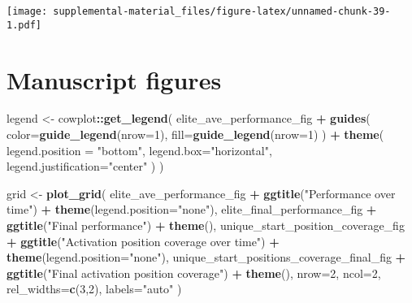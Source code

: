 \documentclass[]{book}
\newenvironment{Shaded}{\begin{snugshade}}{\end{snugshade}}
\newcommand{\DataTypeTok}[1]{\textcolor[rgb]{0.13,0.29,0.53}{#1}}
\newcommand{\DecValTok}[1]{\textcolor[rgb]{0.00,0.00,0.81}{#1}}
\newcommand{\KeywordTok}[1]{\textcolor[rgb]{0.13,0.29,0.53}{\textbf{#1}}}
\newcommand{\NormalTok}[1]{#1}
\newcommand{\OperatorTok}[1]{\textcolor[rgb]{0.81,0.36,0.00}{\textbf{#1}}}
\newcommand{\StringTok}[1]{\textcolor[rgb]{0.31,0.60,0.02}{#1}}
\begin{document}
\texttt{[image: supplemental-material\_files/figure-latex/unnamed-chunk-39-1.pdf]}

\hypertarget{manuscript-figures-2}{%
\section{Manuscript figures}\label{manuscript-figures-2}}

\begin{Shaded}
\begin{Highlighting}[]
\NormalTok{legend <-}\StringTok{ }\NormalTok{cowplot}\OperatorTok{::}\KeywordTok{get_legend}\NormalTok{(}
\NormalTok{    elite_ave_performance_fig }\OperatorTok{+}
\StringTok{      }\KeywordTok{guides}\NormalTok{(}
        \DataTypeTok{color=}\KeywordTok{guide_legend}\NormalTok{(}\DataTypeTok{nrow=}\DecValTok{1}\NormalTok{),}
        \DataTypeTok{fill=}\KeywordTok{guide_legend}\NormalTok{(}\DataTypeTok{nrow=}\DecValTok{1}\NormalTok{)}
\NormalTok{      ) }\OperatorTok{+}
\StringTok{      }\KeywordTok{theme}\NormalTok{(}
        \DataTypeTok{legend.position =} \StringTok{"bottom"}\NormalTok{,}
        \DataTypeTok{legend.box=}\StringTok{"horizontal"}\NormalTok{,}
        \DataTypeTok{legend.justification=}\StringTok{"center"}
\NormalTok{      )}
\NormalTok{  )}

\NormalTok{grid <-}\StringTok{ }\KeywordTok{plot_grid}\NormalTok{(}
\NormalTok{  elite_ave_performance_fig }\OperatorTok{+}
\StringTok{    }\KeywordTok{ggtitle}\NormalTok{(}\StringTok{"Performance over time"}\NormalTok{) }\OperatorTok{+}
\StringTok{    }\KeywordTok{theme}\NormalTok{(}\DataTypeTok{legend.position=}\StringTok{"none"}\NormalTok{),}
\NormalTok{  elite_final_performance_fig }\OperatorTok{+}
\StringTok{    }\KeywordTok{ggtitle}\NormalTok{(}\StringTok{"Final performance"}\NormalTok{) }\OperatorTok{+}
\StringTok{    }\KeywordTok{theme}\NormalTok{(),}
\NormalTok{  unique_start_position_coverage_fig }\OperatorTok{+}
\StringTok{    }\KeywordTok{ggtitle}\NormalTok{(}\StringTok{"Activation position coverage over time"}\NormalTok{) }\OperatorTok{+}
\StringTok{    }\KeywordTok{theme}\NormalTok{(}\DataTypeTok{legend.position=}\StringTok{"none"}\NormalTok{),}
\NormalTok{  unique_start_positions_coverage_final_fig }\OperatorTok{+}
\StringTok{    }\KeywordTok{ggtitle}\NormalTok{(}\StringTok{"Final activation position coverage"}\NormalTok{) }\OperatorTok{+}
\StringTok{    }\KeywordTok{theme}\NormalTok{(),}
  \DataTypeTok{nrow=}\DecValTok{2}\NormalTok{,}
  \DataTypeTok{ncol=}\DecValTok{2}\NormalTok{,}
  \DataTypeTok{rel_widths=}\KeywordTok{c}\NormalTok{(}\DecValTok{3}\NormalTok{,}\DecValTok{2}\NormalTok{),}
  \DataTypeTok{labels=}\StringTok{"auto"}
\NormalTok{)}


\end{Highlighting}
\end{Shaded}
\end{document}
